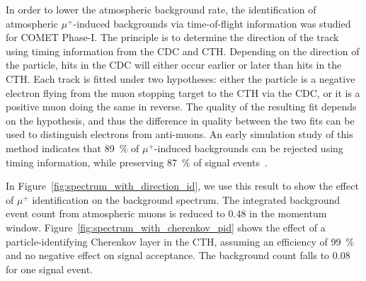 In order to lower the atmospheric background rate, the identification of
atmospheric $\mu^+$-induced backgrounds via time-of-flight information was
studied for COMET Phase\nobreakdash-I. The principle is to determine the direction of the
track using timing information from the CDC and CTH. Depending on the direction
of the particle, hits in the CDC will either occur earlier or later than hits in
the CTH. Each track is fitted under two hypotheses: either the particle is a
negative electron flying from the muon stopping target to the CTH via the CDC,
or it is a positive muon doing the same in reverse. The quality of the resulting
fit depends on the hypothesis, and thus the difference in quality between the
two fits can be used to distinguish electrons from anti-muons. An early
simulation study of this method indicates that \SI{89}{\percent} of
$\mu^+$-induced backgrounds can be rejected using timing information, while
preserving \SI{87}{\percent} of signal events~\cite{moritsu}. 

In Figure~\ref{fig:spectrum_with_direction_id}, we use this result to show the
effect of $\mu^+$ identification on the background spectrum. The integrated
background event count from atmospheric muons is reduced to 0.48 in the momentum
window. Figure~\ref{fig:spectrum_with_cherenkov_pid} shows the effect of a
particle-identifying Cherenkov layer in the CTH, assuming an efficiency of
\SI{99}{\percent} and no negative effect on signal acceptance. The background
count falls to 0.08 for one signal event.

